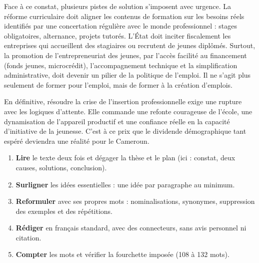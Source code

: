 \documentclass[11pt]{article}
\begin{document}
\begin{exercice}
Face à ce constat, plusieurs pistes de solution s'imposent avec urgence. La réforme curriculaire doit aligner les contenus de formation sur les besoins réels identifiés par une concertation régulière avec le monde professionnel : stages obligatoires, alternance, projets tutorés. L'État doit inciter fiscalement les entreprises qui accueillent des stagiaires ou recrutent de jeunes diplômés. Surtout, la promotion de l'entrepreneuriat des jeunes, par l'accès facilité au financement (fonds jeunes, microcrédit), l'accompagnement technique et la simplification administrative, doit devenir un pilier de la politique de l'emploi. Il ne s'agit plus seulement de former pour l'emploi, mais de former à la création d'emplois.

En définitive, résoudre la crise de l'insertion professionnelle exige une rupture avec les logiques d'attente. Elle commande une refonte courageuse de l'école, une dynamisation de l'appareil productif et une confiance réelle en la capacité d'initiative de la jeunesse. C'est à ce prix que le dividende démographique tant espéré deviendra une réalité pour le Cameroun.
\end{exercice}

\begin{methode}
\begin{enumerate}
    \item \textbf{Lire} le texte deux fois et dégager la thèse et le plan (ici : constat, deux causes, solutions, conclusion).
    \item \textbf{Surligner} les idées essentielles : une idée par paragraphe au minimum.
    \item \textbf{Reformuler} avec ses propres mots : nominalisations, synonymes, suppression des exemples et des répétitions.
    \item \textbf{Rédiger} en français standard, avec des connecteurs, sans avis personnel ni citation.
    \item \textbf{Compter} les mots et vérifier la fourchette imposée (108 à 132 mots).
\end{enumerate}
\end{methode}
\end{document}

